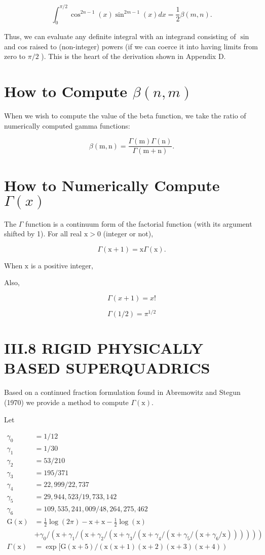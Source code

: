 $$
\int_{0}^{\pi / 2} \cos ^{2 n-1}(x) \sin ^{2 m-1}(x) d x=\frac{1}{2} \beta(m, n) .
$$

Thus, we can evaluate any definite integral with an integrand consisting of $\sin$ and cos raised to (non-integer) powers (if we can coerce it into having limits from zero to $\pi / 2$ ). This is the heart of the derivation shown in Appendix D.

\section{How to Compute $\beta(n, m)$}
When we wish to compute the value of the beta function, we take the ratio of numerically computed gamma functions:

$$
\beta(\mathrm{m}, \mathrm{n})=\frac{\Gamma(\mathrm{m}) \Gamma(\mathrm{n})}{\Gamma(\mathrm{m}+\mathrm{n})} .
$$

\section{How to Numerically Compute $\Gamma(x)$}
The $\Gamma$ function is a continuum form of the factorial function (with its argument shifted by 1). For all real $\mathrm{x}>0$ (integer or not),

$$
\Gamma(\mathrm{x}+1)=\mathrm{x} \Gamma(\mathrm{x}) .
$$

When $\mathrm{x}$ is a positive integer,

Also,

$$
\Gamma(x+1)=x !
$$

$$
\Gamma(1 / 2)=\pi^{1 / 2}
$$

\section{III.8 RIGID PHYSICALLY BASED SUPERQUADRICS}
Based on a continued fraction formulation found in Abremowitz and Stegun (1970) we provide a method to compute $\Gamma(\mathrm{x})$.

Let

$$
\begin{aligned}
\gamma_{0} &=1 / 12 \\
\gamma_{1} &=1 / 30 \\
\gamma_{2} &=53 / 210 \\
\gamma_{3} &=195 / 371 \\
\gamma_{4} &=22,999 / 22,737 \\
\gamma_{5} &=29,944,523 / 19,733,142 \\
\gamma_{6} &=109,535,241,009 / 48,264,275,462 \\
\mathrm{G}(\mathrm{x}) &=\frac{1}{2} \log (2 \pi)-\mathrm{x}+\mathrm{x}-\frac{1}{2} \log (\mathrm{x}) \\
&+\gamma_{0} /\left(\mathrm{x}+\gamma_{1} /\left(\mathrm{x}+\gamma_{2} /\left(\mathrm{x}+\gamma_{3} /\left(\mathrm{x}+\gamma_{4} /\left(\mathrm{x}+\gamma_{5} /\left(\mathrm{x}+\gamma_{6} / \mathrm{x}\right)\right)\right)\right)\right)\right) \\
\Gamma(\mathrm{x}) &=\exp [\mathrm{G}(\mathrm{x}+5) /(\mathrm{x}(\mathrm{x}+1)(\mathrm{x}+2)(\mathrm{x}+3)(\mathrm{x}+4))
\end{aligned}
$$

